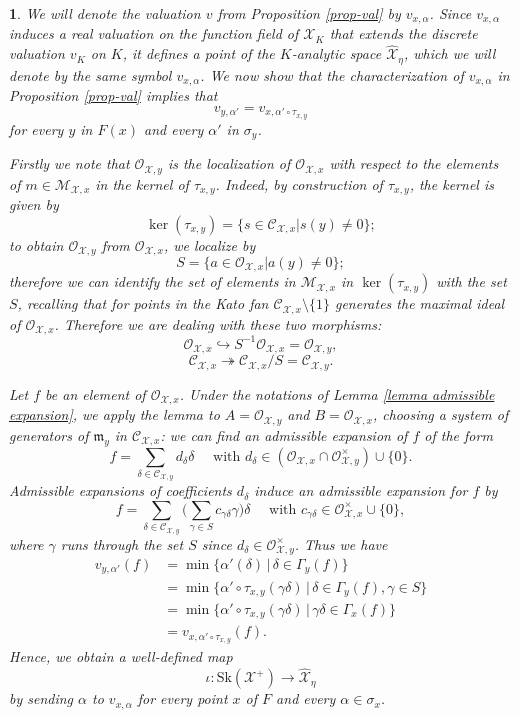 \documentclass{amsart}%
\numberwithin{equation}{subsection}
\theoremstyle{plain2}
\theoremstyle{definition2}
\theoremstyle{stepstyle}
\theoremstyle{point}
\theoremstyle{subpoint}
\newtheorem{subpoint}[equation]{}%
\newcommand{\spa}[1]{\begin{subpoint}#1\end{subpoint}}           %
\newcommand{\cX}{\ensuremath{\mathscr{X}}}
\newcommand{\caM}{\ensuremath{\mathcal{M}}}
\newcommand{\caC}{\ensuremath{\mathcal{C}}}
\newcommand{\caO}{\ensuremath{\mathcal{O}}}
\newcommand{\Sk}{\mathrm{Sk}}
\begin{document}
\spa{ We will denote the valuation $v$ from Proposition
\ref{prop-val} by $v_{x,\alpha}$. Since $v_{x,\alpha}$ induces a
real valuation on the function field of $\cX_K$ that extends the
discrete valuation $v_K$ on $K$, it defines a point of the
$K$-analytic space $\widehat{\cX}_\eta$, which we will denote by
the same symbol $v_{x,\alpha}$.
We now show that the characterization of $v_{x,\alpha}$ in Proposition \ref{prop-val} implies that $$v_{y,\alpha'}=v_{x,\alpha'\circ \tau_{x,y}}$$ for every $y$ in $F(x)$ and every $\alpha'$ in $\sigma_y$.

Firstly we note that  $\mathcal{O}_{\cX,y}$ is the localization of $\mathcal{O}_{\cX,x}$ with respect to the elements of $m\in \mathcal{M}_{\cX,x}$ in the kernel of $\tau_{x,y}$.
Indeed, by construction of $\tau_{x,y}$, the kernel is given by $$\ker (\tau_{x,y})= \{s \in \caC_{\cX,x} | s(y) \neq 0 \};$$ to obtain $\mathcal{O}_{\cX,y}$ from $\mathcal{O}_{\cX,x}$, we localize  by $$S=\{a \in \mathcal{O}_{\cX,x} | a(y) \neq 0 \};$$ therefore we can identify the set of elements in $\caM_{\cX,x}$ in $\ker(\tau_{x,y})$ with the set $S$, recalling that for points in the Kato fan $\mathcal{C}_{\cX,x}\setminus \{1\}$ generates the maximal ideal of $\mathcal{O}_{\cX,x}$. Therefore we are dealing with these two morphisms:
$$\caO_{\cX,x} \hookrightarrow S^{-1}\caO_{\cX,x}=\caO_{\cX,y},$$
$$ \caC_{\cX,x} \twoheadrightarrow \caC_{\cX,x}/S = \caC_{\cX,y}.$$

Let $f$ be an element of $ \caO_{\cX,x}$. Under the notations of Lemma \ref{lemma admissible expansion}, we apply the lemma to $A= \caO_{\cX,y}$ and $B=\caO_{\cX,x}$, choosing a system of generators of $\mathfrak{m}_y$ in $\caC_{\cX,x}$: we can find an admissible expansion of $f$ of the form $$f=\sum_{\delta \in \mathcal{C}_{\cX,y}}d_{\delta}\delta \quad \text{ with }d_\delta \in (\caO_{\cX,x} \cap \caO_{\cX,y}^\times) \cup \{0\}.$$ Admissible expansions of coefficients $d_\delta$ induce an admissible expansion for $f$ by $$f=\sum_{\delta \in \mathcal{C}_{\cX,y}}\big( \sum_{\gamma \in S} c_{\gamma \delta} \gamma \big)\delta \quad \text{ with }c_{\gamma \delta} \in \caO_{\cX,x}^\times \cup \{0\},$$ where $\gamma$ runs through the set $S$ since $d_\delta \in \caO_{\cX,y}^\times$. Thus we have \begin{align*}
v_{y,\alpha'}(f) &= \min\{\alpha'(\delta)\,|\,\delta\in \Gamma_y(f)\}\\
& = \min\{\alpha' \circ \tau_{x,y}( \gamma \delta)\,|\,\delta\in \Gamma_y(f), \gamma \in S\}\\
& = \min\{\alpha' \circ \tau_{x,y}( \gamma \delta)\,|\,\gamma\delta\in \Gamma_x(f)\}\\
& = v_{x,\alpha' \circ \tau_{x,y}}(f).
\end{align*}
Hence, we obtain a well-defined map $$\iota:\Sk(\cX^+)\to \widehat{\cX}_\eta$$ by sending $\alpha$ to $v_{x,\alpha}$ for every point $x$ of $F$ and every $\alpha\in \sigma_x$.}
\end{document}
